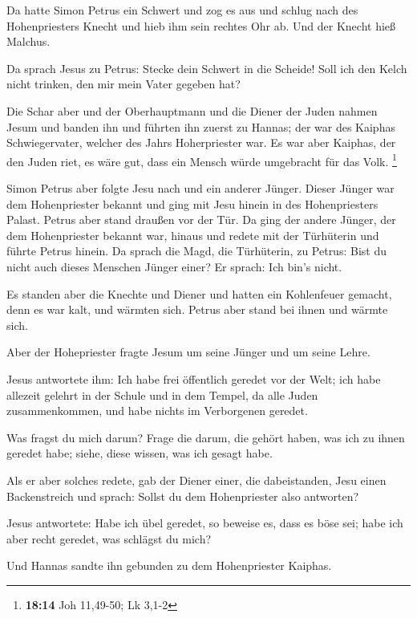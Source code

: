  Da hatte Simon Petrus ein Schwert und zog es aus und
schlug nach des Hohenpriesters Knecht und hieb ihm sein rechtes Ohr ab.
Und der Knecht hieß Malchus.

 Da sprach Jesus zu Petrus: Stecke dein Schwert in die
Scheide! Soll ich den Kelch nicht trinken, den mir mein Vater gegeben
hat?

 Die Schar aber und der Oberhauptmann und die Diener der
Juden nahmen Jesum und banden ihn  und führten ihn zuerst
zu Hannas; der war des Kaiphas Schwiegervater, welcher des Jahrs
Hoherpriester war.  Es war aber Kaiphas, der den Juden
riet, es wäre gut, dass ein Mensch würde umgebracht für das Volk.
\footnote{\textbf{18:14} Joh 11,49-50; Lk 3,1-2}

 Simon Petrus aber folgte Jesu nach und ein anderer
Jünger. Dieser Jünger war dem Hohenpriester bekannt und ging mit Jesu
hinein in des Hohenpriesters Palast.  Petrus aber stand
draußen vor der Tür. Da ging der andere Jünger, der dem Hohenpriester
bekannt war, hinaus und redete mit der Türhüterin und führte Petrus
hinein.  Da sprach die Magd, die Türhüterin, zu Petrus:
Bist du nicht auch dieses Menschen Jünger einer? Er sprach: Ich bin's
nicht.

 Es standen aber die Knechte und Diener und hatten ein
Kohlenfeuer gemacht, denn es war kalt, und wärmten sich. Petrus aber
stand bei ihnen und wärmte sich.

 Aber der Hohepriester fragte Jesum um seine Jünger und
um seine Lehre.

 Jesus antwortete ihm: Ich habe frei öffentlich geredet
vor der Welt; ich habe allezeit gelehrt in der Schule und in dem Tempel,
da alle Juden zusammenkommen, und habe nichts im Verborgenen geredet.

 Was fragst du mich darum? Frage die darum, die gehört
haben, was ich zu ihnen geredet habe; siehe, diese wissen, was ich
gesagt habe.

 Als er aber solches redete, gab der Diener einer, die
dabeistanden, Jesu einen Backenstreich und sprach: Sollst du dem
Hohenpriester also antworten?

 Jesus antwortete: Habe ich übel geredet, so beweise es,
dass es böse sei; habe ich aber recht geredet, was schlägst du mich?

 Und Hannas sandte ihn gebunden zu dem Hohenpriester
Kaiphas.


